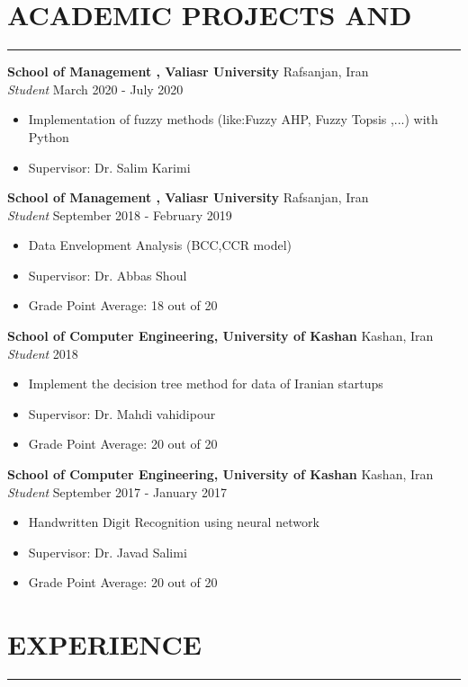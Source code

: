 \documentclass[12pt]{res} %
\begin{document}
\begin{resume}
\section{\bf ACADEMIC PROJECTS AND }
\vspace{-8pt}
\noindent\rule{\textwidth}{0.5mm}

{\bf  School of Management , Valiasr University} \hfill Rafsanjan, Iran \\
\textit {Student} \hfill March 2020 - July 2020
\begin{itemize}
\item Implementation of fuzzy methods (like:Fuzzy AHP, Fuzzy Topsis ,...) with Python
\item Supervisor: Dr. Salim Karimi
\end{itemize}
\vspace{40pt}
{\bf  School of Management , Valiasr University} \hfill Rafsanjan, Iran \\
\textit{Student} \hfill September 2018 - February 2019 
\begin{itemize}
\item Data Envelopment Analysis  (BCC,CCR model)
\item Supervisor: Dr. Abbas Shoul
\item Grade Point Average: 18 out of 20
\end{itemize}
\vspace{8pt}
{\bf School of Computer Engineering, University of Kashan} \hfill Kashan, Iran \\
\textit{Student} \hfill  2018 
\begin{itemize}
\item Implement the decision tree method for data of Iranian startups
\item Supervisor: Dr. Mahdi vahidipour
\item Grade Point Average: 20 out of 20 
\end{itemize}

{\bf School of Computer Engineering, University of Kashan} \hfill Kashan, Iran \\
\textit{Student} \hfill September 2017 - January 2017 
\begin{itemize}
\item Handwritten Digit Recognition using neural network
\item Supervisor: Dr. Javad Salimi
\item Grade Point Average: 20 out of 20
\end{itemize}

\section{\bf EXPERIENCE}
\vspace{-8pt}
\noindent\rule{\textwidth}{0.5mm}


\end{resume}
\end{document}
